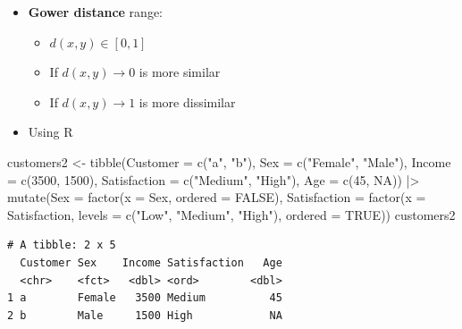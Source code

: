 \documentclass[
  ignorenonframetext,
]{beamer}
\newenvironment{Shaded}{\begin{snugshade}}{\end{snugshade}}
\newcommand{\AttributeTok}[1]{\textcolor[rgb]{0.40,0.45,0.13}{#1}}
\newcommand{\ConstantTok}[1]{\textcolor[rgb]{0.56,0.35,0.01}{#1}}
\newcommand{\DecValTok}[1]{\textcolor[rgb]{0.68,0.00,0.00}{#1}}
\newcommand{\FunctionTok}[1]{\textcolor[rgb]{0.28,0.35,0.67}{#1}}
\newcommand{\NormalTok}[1]{\textcolor[rgb]{0.00,0.23,0.31}{#1}}
\newcommand{\OtherTok}[1]{\textcolor[rgb]{0.00,0.23,0.31}{#1}}
\newcommand{\SpecialCharTok}[1]{\textcolor[rgb]{0.37,0.37,0.37}{#1}}
\newcommand{\StringTok}[1]{\textcolor[rgb]{0.13,0.47,0.30}{#1}}
\providecommand{\tightlist}{%
  \setlength{\itemsep}{0pt}\setlength{\parskip}{0pt}}\usepackage{longtable,booktabs,array}
\begin{document}
\begin{frame}[fragile]{}
\label{section-16}
\begin{itemize}
\item
  \textbf{Gower distance} range:

  \begin{itemize}
  \tightlist
  \item
    \(d(x,y) \in [0,1]\)
  \item
    If \(d(x,y) \longrightarrow 0\) is more similar
  \item
    If \(d(x,y) \longrightarrow 1\) is more dissimilar
  \end{itemize}
\item
  Using R
\end{itemize}

\tiny

\begin{Shaded}
\begin{Highlighting}[]
\NormalTok{customers2 }\OtherTok{\textless{}{-}} \FunctionTok{tibble}\NormalTok{(}\AttributeTok{Customer =} \FunctionTok{c}\NormalTok{(}\StringTok{"a"}\NormalTok{, }\StringTok{"b"}\NormalTok{),}
                     \AttributeTok{Sex =} \FunctionTok{c}\NormalTok{(}\StringTok{"Female"}\NormalTok{, }\StringTok{"Male"}\NormalTok{),}
                     \AttributeTok{Income =} \FunctionTok{c}\NormalTok{(}\DecValTok{3500}\NormalTok{, }\DecValTok{1500}\NormalTok{),}
                     \AttributeTok{Satisfaction =} \FunctionTok{c}\NormalTok{(}\StringTok{"Medium"}\NormalTok{, }\StringTok{"High"}\NormalTok{),}
                     \AttributeTok{Age =} \FunctionTok{c}\NormalTok{(}\DecValTok{45}\NormalTok{, }\ConstantTok{NA}\NormalTok{)) }\SpecialCharTok{|\textgreater{}} 
  \FunctionTok{mutate}\NormalTok{(}\AttributeTok{Sex =} \FunctionTok{factor}\NormalTok{(}\AttributeTok{x =}\NormalTok{ Sex, }
                      \AttributeTok{ordered =} \ConstantTok{FALSE}\NormalTok{),}
         \AttributeTok{Satisfaction =} \FunctionTok{factor}\NormalTok{(}\AttributeTok{x =}\NormalTok{ Satisfaction, }
                               \AttributeTok{levels =} \FunctionTok{c}\NormalTok{(}\StringTok{"Low"}\NormalTok{, }\StringTok{"Medium"}\NormalTok{, }\StringTok{"High"}\NormalTok{),}
                               \AttributeTok{ordered =} \ConstantTok{TRUE}\NormalTok{))}
\NormalTok{customers2}
\end{Highlighting}
\end{Shaded}

\begin{verbatim}
# A tibble: 2 x 5
  Customer Sex    Income Satisfaction   Age
  <chr>    <fct>   <dbl> <ord>        <dbl>
1 a        Female   3500 Medium          45
2 b        Male     1500 High            NA
\end{verbatim}
\end{frame}
\end{document}
